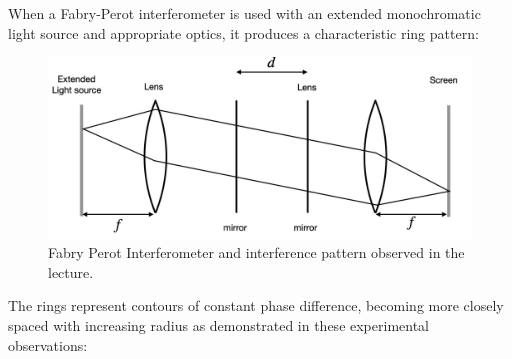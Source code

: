 \documentclass[
  a4paper,
]{book}
\begin{document}
When a Fabry-Perot interferometer is used with an extended monochromatic
light source and appropriate optics, it produces a characteristic ring
pattern:

\begin{figure}[H]

{\centering \includegraphics[width=0.9\linewidth,height=\textheight,keepaspectratio]{wave-optics/img/fabry_w_lens.png}

}

\caption{Fabry Perot Interferometer and interference pattern observed in
the lecture.}

\end{figure}%

The rings represent contours of constant phase difference, becoming more
closely spaced with increasing radius as demonstrated in these
experimental observations:
\end{document}
